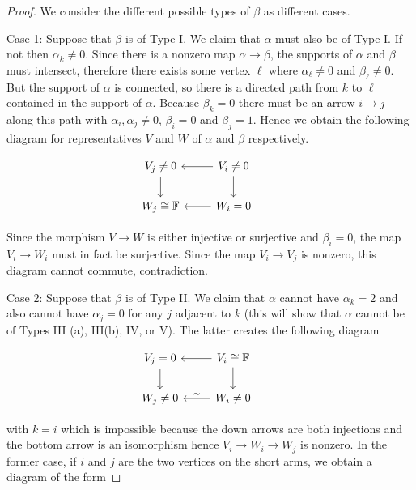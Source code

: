 \documentclass[10pt,a4paper]{amsart}
\begin{document}
\begin{proof}
We consider the different possible types of $\beta$ as different cases. 

Case 1: Suppose that $\beta$ is of Type I. We claim that $\alpha$ must also be of Type I. If not then $\alpha_k \neq 0$. Since there is a nonzero map $\alpha \to \beta$, the supports of $\alpha$ and $\beta$ must intersect, therefore there exists some vertex $\ell$ where $\alpha_\ell \neq 0$ and $\beta_\ell \neq 0$. But the support of $\alpha$ is connected, so there is a directed path from $k$ to $\ell$ contained in the support of $\alpha$. Because $\beta_k = 0$ there must be an arrow $i \to j$ along this path with $\alpha_i , \alpha_j \neq 0$, $\beta_i=0$ and $\beta_j=1$. Hence we obtain the following diagram for representatives $V$ and $W$ of $\alpha$ and $\beta$ respectively.

\begin{equation}\label{eq: first diagram}
\begin{tikzcd}
V_j \neq 0 \arrow[d]  & V_i \neq 0 \arrow[l]  \arrow[d] & 
\\ W_j \cong \mathbb{F} & W_i = 0 \arrow[l] 
\end{tikzcd}
\end{equation}

Since the morphism $V \to W$ is either injective or surjective and $\beta_i = 0$, the map $V_i \to W_i$ must in fact be surjective. Since the map $V_i \to V_j$ is nonzero, this diagram cannot commute, contradiction. 

Case 2: Suppose that $\beta$ is of Type II. We claim that $\alpha$ cannot have $\alpha_k = 2$ and also cannot have $\alpha_j = 0$ for any $j$ adjacent to $k$ (this will show that $\alpha$ cannot be of Types III (a), III(b), IV, or V). The latter creates the following diagram

\begin{equation}\label{eq: one to zero bottom iso}
\begin{tikzcd}
V_j = 0 \arrow[d]  & V_i \cong \mathbb{F} \arrow[l]  \arrow[d] & 
\\ W_j \neq 0 & W_i \neq 0 \arrow[l, "\sim" '] 
\end{tikzcd}
\end{equation}

with $k = i$ which is impossible because the down arrows are both injections and the bottom arrow is an isomorphism hence $V_i \to W_i \to W_j$ is nonzero. In the former case, if $i$ and $j$ are the two vertices on the short arms, we obtain a diagram of the form 


\end{proof}
\end{document}
